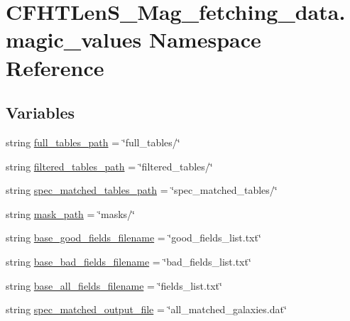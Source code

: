\hypertarget{namespaceCFHTLenS__Mag__fetching__data_1_1magic__values}{}\section{C\+F\+H\+T\+Len\+S\+\_\+\+Mag\+\_\+fetching\+\_\+data.\+magic\+\_\+values Namespace Reference}
\label{namespaceCFHTLenS__Mag__fetching__data_1_1magic__values}
\subsection*{Variables}
\begin{DoxyCompactItemize}
\item 
string \hyperlink{namespaceCFHTLenS__Mag__fetching__data_1_1magic__values_a6623af4a04d0c179f222fed2ebefd1c4}{full\+\_\+tables\+\_\+path} = \char`\"{}full\+\_\+tables/\char`\"{}
\item 
string \hyperlink{namespaceCFHTLenS__Mag__fetching__data_1_1magic__values_aad072510df8746840ffa27dec1412edf}{filtered\+\_\+tables\+\_\+path} = \char`\"{}filtered\+\_\+tables/\char`\"{}
\item 
string \hyperlink{namespaceCFHTLenS__Mag__fetching__data_1_1magic__values_a569e8242a22473719634cb6689432e43}{spec\+\_\+matched\+\_\+tables\+\_\+path} = \char`\"{}spec\+\_\+matched\+\_\+tables/\char`\"{}
\item 
string \hyperlink{namespaceCFHTLenS__Mag__fetching__data_1_1magic__values_a878848b9f808cb3179e8c9da5a4c3dfe}{mask\+\_\+path} = \char`\"{}masks/\char`\"{}
\item 
string \hyperlink{namespaceCFHTLenS__Mag__fetching__data_1_1magic__values_ae3fe6964df3fa290e69d437cf8822643}{base\+\_\+good\+\_\+fields\+\_\+filename} = \char`\"{}good\+\_\+fields\+\_\+list.\+txt\char`\"{}
\item 
string \hyperlink{namespaceCFHTLenS__Mag__fetching__data_1_1magic__values_a7b2ee7b5c782ab9a557d8dfc76a54d54}{base\+\_\+bad\+\_\+fields\+\_\+filename} = \char`\"{}bad\+\_\+fields\+\_\+list.\+txt\char`\"{}
\item 
string \hyperlink{namespaceCFHTLenS__Mag__fetching__data_1_1magic__values_a6f1af329b28ab8462022dfb43da9f383}{base\+\_\+all\+\_\+fields\+\_\+filename} = \char`\"{}fields\+\_\+list.\+txt\char`\"{}
\item 
string \hyperlink{namespaceCFHTLenS__Mag__fetching__data_1_1magic__values_a3a435017ca0c52b0b2c9321234e3098b}{spec\+\_\+matched\+\_\+output\+\_\+file} = \char`\"{}all\+\_\+matched\+\_\+galaxies.\+dat\char`\"{}

\end{DoxyCompactItemize}

